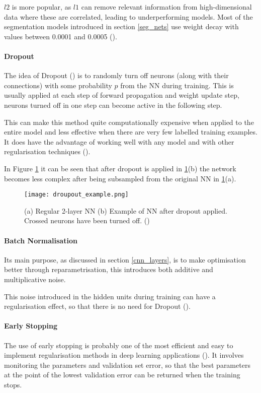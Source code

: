 $l2$ is more popular, as $l1$ can remove relevant information from high-dimensional data where these are correlated, leading to underperforming models. Most of the segmentation models introduced in section \ref{seg_nets} use weight decay with values between 0.0001 and 0.0005 (\cite{sultana2020106062}).
\paragraph{Dropout} 
The idea of Dropout (\cite{JMLR:v15:srivastava14a}) is to randomly turn off neurons (along with their connections) with some probability $p$ from the \gls{NN} during training. This is usually applied at each step of forward propagation and weight update step, neurons turned off in one step can become active in the following step.

This can make this method quite computationally expensive when applied to the entire model and less effective when there are very few labelled training examples. It does have the advantage of working well with any model and with other regularisation techniques (\cite{GoodBengCour16}).

In Figure \ref{fig_dropout} it can be seen that after dropout is applied in \ref{fig_dropout}(b) the network becomes less complex after being subsampled from the original \gls{NN} in \ref{fig_dropout}(a).

    \begin{figure}[hbt!]
        \centering
        \texttt{[image: droupout\_example.png]}
        \caption{(a) Regular 2-layer \gls{NN} (b) Example of \gls{NN} after dropout applied. Crossed neurons have been turned off. (\cite{shanmugamani2018deep})}
        \label{fig_dropout}
    \end{figure}

\paragraph{Batch Normalisation}
Its main purpose, as discussed in section \ref{cnn_layers}, is to make optimisation better through reparametrisation, this introduces both additive and multiplicative noise.

This noise introduced in the hidden units during training can have a regularisation effect, so that there is no need for Dropout (\cite{GoodBengCour16}).
\paragraph{Early Stopping} 
The use of early stopping is probably one of the most efficient and easy to implement regularisation methods in deep learning applications (\cite{GoodBengCour16}). It involves monitoring the parameters and validation set error, so that the best parameters at the point of the lowest validation error can be returned when the training stops. 

